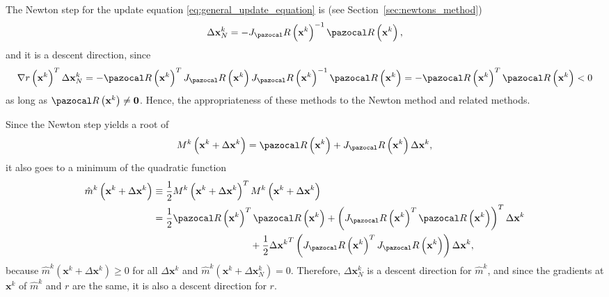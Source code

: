 The Newton step for the update equation \eqref{eq:general_update_equation} is (see Section~\ref{sec:newtons_method})
\begin{equation}
\Delta \mathbf x^k_N =  - J_ \pazocal R\left(\mathbf x^k\right)^{-1} \pazocal R\left(\mathbf x^k\right),
\end{equation}
and it is a descent direction, since
\begin{equation}
  \nabla r\left(\mathbf x^k\right)^{T} \Delta \mathbf x^k_N=-\pazocal R\left(\mathbf x^k\right)^{T} J_\pazocal R\left(\mathbf x^k\right) J_\pazocal R\left(\mathbf x^k\right)^{-1} \pazocal R\left(\mathbf x^k\right)=-\pazocal R\left(\mathbf x^k\right)^{T} \pazocal R\left(\mathbf x^k\right)<0
\end{equation}
as long as \(\pazocal R\left(\mathbf x^k\right) \neq \mathbf 0\).
Hence, the appropriateness of these methods to the Newton method and related methods.

Since the Newton step yields a root of
\begin{equation}
  M^k\left(\mathbf x^k+\Delta \mathbf x^k\right)=\pazocal R\left(\mathbf x^k\right)+J_\pazocal R\left(\mathbf x^k\right) \Delta \mathbf x^k,
\end{equation}
it also goes to a minimum of the quadratic function
\begin{equation}
  \begin{aligned}
    \hat{m}^k\left(\mathbf x^k+\Delta \mathbf x^k\right) & \equiv \frac{1}{2} M^k\left(\mathbf x^k+ \Delta \mathbf x^k\right)^{T} M^k\left(\mathbf x^k+\Delta \mathbf x^k\right) \\
    &= \frac{1}{2} \pazocal R\left(\mathbf x^k\right)^{T} \pazocal R\left(\mathbf x^k\right)+\left(J_\pazocal R\left(\mathbf x^k\right)^{T} \pazocal R\left(\mathbf x^k\right)\right)^{T} \Delta \mathbf x^k\\
    & \qquad\qquad\qquad\qquad\qquad+\frac{1}{2} \Delta {\mathbf x^k}^{T}\left(J_\pazocal R\left(\mathbf x^k\right)^{T} J_\pazocal R\left(\mathbf x^k\right)\right) \Delta \mathbf x^k,
  \end{aligned}
\end{equation}
because \(\hat{m}^k\left(\mathbf x^k+\Delta \mathbf x^k\right) \geq 0\) for all \(\Delta \mathbf x^k\) and \(\hat{m}^k\left(\mathbf x^k+\Delta \mathbf x^k_N\right)=0\).
Therefore, \(\Delta \mathbf x^k_N\) is a descent direction for \(\hat{m}^k\), and since the gradients at \(\mathbf x^k\) of \(\hat{m}^k\) and \(r\) are the same, it is also a descent direction for \(r\).

